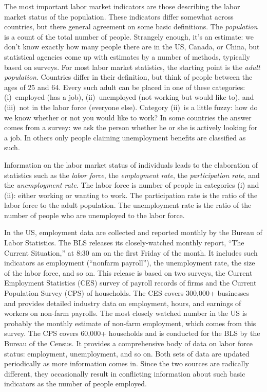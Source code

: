 \documentclass[letterpaper,12pt]{article}
\begin{document}
The most important labor market indicators are those describing
the labor market status of the population. 
These indicators differ somewhat across countries, 
but there general agreement on some basic definitions.  
The {\it population\/}
is a count of the total number of people. Strangely enough, it's
an estimate: we don't know exactly how many people there are in
the US, Canada, or China, but statistical agencies come up
with estimates by a number of methods, typically based on surveys.
For most labor market statistics, 
the starting point is the 
{\it adult population\/}. 
Countries differ in their definition, 
but think of people between the ages of 25 and 64.  
Every such adult can be placed in one of these categories: 
(i)~employed (has a job), (ii)~unemployed (not working but would like to), 
and (iii)~not in the labor force
(everyone else). 
Category (ii)~is a little fuzzy:  how do we know whether or not 
you would like to work? In some countries the answer comes from a
survey: we ask the person whether he or she is actively looking
for a job. In others only people claiming unemployment benefits
are classified as such.


Information on the labor market status of individuals leads to the
elaboration of statistics such as the {\it labor force\/}, 
the {\it employment rate\/}, 
the {\it participation rate\/}, 
and the {\it unemployment rate\/}. 
The labor force is number of people in categories (i) and
(ii): either working or wanting to work. The participation rate is
the ratio of the labor force to the adult population. 
The unemployment rate is the ratio of the number of people who are unemployed to the labor force.


In the US, employment data are collected and reported monthly by
the Bureau of Labor Statistics. The BLS releases its
closely-watched monthly report, ``The Current Situation,'' at
8:30 am on the first Friday of the month.  It includes such
indicators as employment (``nonfarm payroll''), 
the unemployment rate, the size of the labor force,
and so on.  This release is based on two surveys, the Current
Employment Statistics (CES) survey of payroll records of firms and
the Current Population Survey (CPS) of households. The CES covers
300,000+ businesses and provides detailed industry data on
employment, hours, and earnings of workers on non-farm payrolls.
The most closely watched number in the US is probably the monthly
estimate of non-farm employment, which comes from this survey.  
The CPS covers 60,000+ households and is conducted for the BLS by
the Bureau of the Census. It provides a comprehensive body of data
on labor force status:  employment, unemployment, and so on.  Both
sets of data are updated periodically as more information comes
in.  Since the two sources are radically different,
they occasionally result in conflicting information about such
basic indicators as the number of people employed.
\end{document}
